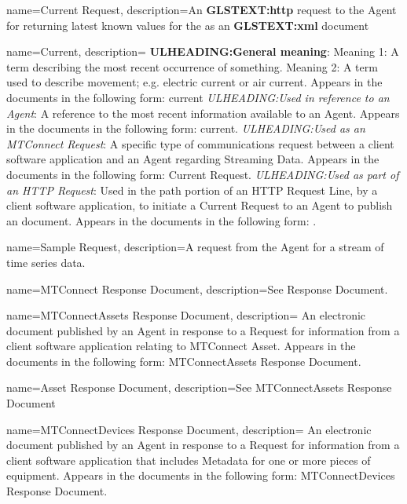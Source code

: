 {
    name={Current Request},
	description={An \textbf{GLSTEXT:http} request to the \gls{Agent} for returning latest known values for the  as an  \textbf{GLSTEXT:xml} document}
}

{
    name={Current},
	description={
	\textbf{ULHEADING:General meaning}:
	Meaning 1:  A term describing the most recent occurrence of something.
	Meaning 2:  A term used to describe movement; e.g. electric current or air current.
	Appears in the documents in the following form: current
	\textit{ULHEADING:Used in reference to an \gls{Agent}}:
	A reference to the most recent information available to an \gls{Agent}.
	Appears in the documents in the following form: current.
	\textit{ULHEADING:Used as an \gls{MTConnect Request}}:
	A specific type of communications request between a client software application and an \gls{Agent} regarding \gls{Streaming Data}.  
	Appears in the documents in the following form: \gls{Current Request}.
	\textit{ULHEADING:Used as part of an \gls{HTTP Request}}:
	Used in the path portion of an \gls{HTTP Request Line}, by a client software application, to initiate a \gls{Current Request} to an \gls{Agent} to publish an  document.
	Appears in the documents in the following form: .
}
}

{
    name={Sample Request},
	description={A request from the \gls{Agent} for a stream of time series data.}
}

{
    name={MTConnect Response Document},
	description={See \gls{Response Document}.}
}

{
    name={MTConnectAssets Response Document},
	description={
	An electronic document published by an \gls{Agent} in response to a \gls{Request} for information from a client software application relating to \gls{MTConnect Asset}.
	Appears in the documents in the following form: \gls{MTConnectAssets Response Document}.
}
}

{
    name={Asset Response Document},
	description={See \gls{MTConnectAssets Response Document}}
}

{
    name={MTConnectDevices Response Document},
	description={
	An electronic document published by an \gls{Agent} in response to a \gls{Request} for information from a client software application that includes \gls{Metadata} for one or more pieces of equipment.
	Appears in the documents in the following form: \gls{MTConnectDevices Response Document}.
}
}

